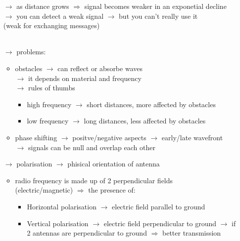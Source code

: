 \begin{itemize}
    \begin{itemize}
        \item[$\rightarrow$] as distance grows $\Rightarrow$ signal becomes
        weaker in an exponetial decline\\
        $\rightarrow$ you can detect a weak signal $\rightarrow$ but you can't
        really use it\\
        \hspace*{5cm}(weak for exchanging messages)\\\\
        \item[$\rightarrow$] problems:
        \begin{itemize}
            \item obstacles $\rightarrow$ can reflect or absorbe waves
            \\$\rightarrow$ it depends on material and frequency
            \\$\rightarrow$ rules of thumbs 
            \begin{itemize}
                \item high frequency $\rightarrow$ short distances, more affected
                by obstacles
                \item low frequency $\rightarrow$ long distances, less affected
                by obstacles
            \end{itemize}
            \item phase shifting $\rightarrow$ positve/negative aspects
            $\rightarrow$ early/late wavefront\\$\rightarrow$ signals can be null
            and overlap each other
        \end{itemize}
        \item[$\rightarrow$] polarisation $\rightarrow$ phisical orientation of
        antenna
        \begin{itemize}
            \item radio frequency is made up of 2 perpendicular fields\\
            (electric/magnetic)
            $\Rightarrow$ the presence of:
            \begin{itemize}
                \item Horizontal polarisation $\rightarrow$ electric field
                parallel to ground
                \item Vertical polarisation $\rightarrow$ electric field
                perpendicular to ground
                $\rightarrow$ if 2 antennas are perpendicular to ground
                $\Rightarrow$ better transmission
            \end{itemize}
        \end{itemize}
    \end{itemize}
\end{itemize}

